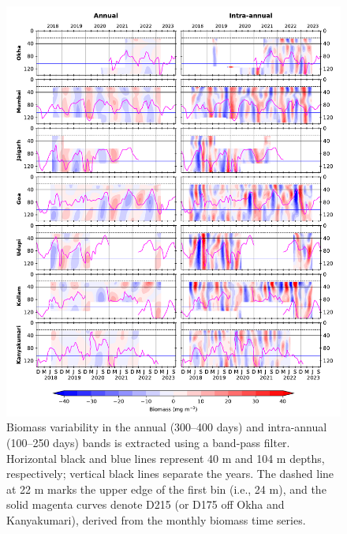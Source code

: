 \documentclass[12pt,a4paper]{article}
\begin{document}
\begin{figure}[htbp]
	\centering
	\includegraphics[width=\textwidth]{./figures/filtered_biomass_annual_intraannual.pdf} 
	\caption{Biomass variability in the annual (300--400 days) and intra-annual (100--250 days) bands is extracted using a band-pass filter. Horizontal black and blue lines represent 40 m and 104 m depths, respectively; vertical black lines separate the years. The dashed line at 22 m marks the upper edge of the first bin (i.e., 24 m), and the solid magenta curves denote D215 (or D175 off Okha and Kanyakumari), derived from the monthly biomass time series.}
	\label{fig:intraannual_annual}
\end{figure}

\end{document}
